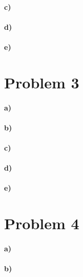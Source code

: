 \documentclass[12pt]{article}
\begin{document}
\paragraph{c)}

\paragraph{d)}

\paragraph{e)}

\section*{Problem 3}

\paragraph{a)}

\paragraph{b)}

\paragraph{c)}

\paragraph{d)}

\paragraph{e)}

\section*{Problem 4}

\paragraph{a)}

\paragraph{b)}
\end{document}
